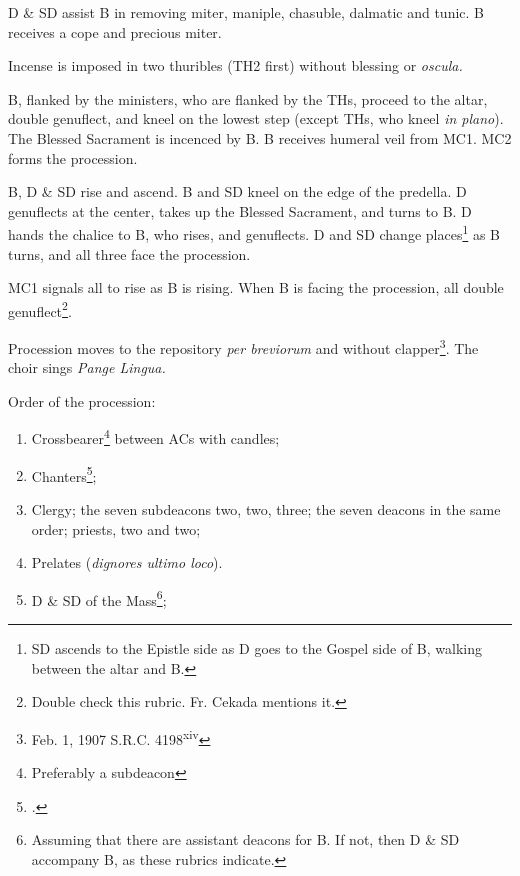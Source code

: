 {\rubric D \& SD assist B in removing miter, maniple, chasuble, dalmatic and
tunic. B receives a cope and precious miter.

\rubric Incense is imposed in two thuribles (TH2 first) without blessing or
\textit{oscula.}

\rubric B, flanked by the ministers, who are flanked by the THs, proceed to the
altar, double genuflect, and kneel on the lowest step (except THs, who kneel
\textit{in plano}). The Blessed Sacrament is incenced by B. B receives humeral
veil from MC1. MC2 forms the procession.

\rubric B, D \& SD rise and ascend. B and SD kneel on the edge of the predella.
D genuflects at the center, takes up the Blessed Sacrament, and turns to B. D
hands the chalice to B, who rises, and genuflects. D and SD change
places\footnote{SD ascends to the Epistle side as D goes to the Gospel side of
B, walking between the altar and B.} as B turns, and all three face the
procession.

\rubric MC1 signals all to rise as B is rising. When B is facing the
procession, all double genuflect\footnote{Double check this rubric. Fr. Cekada
mentions it.}.

\rubric Procession moves to the repository \textit{per breviorum} and without
clapper\footnote{Feb. 1, 1907 S.R.C. 4198\textsuperscript{xiv}}. The choir
sings \textit{Pange Lingua.}

\rubric Order of the procession:

\begin{enumerate}
    
    \item Crossbearer\footnote{Preferably a subdeacon} between ACs with
        candles;

    \item Chanters\footcite[``If they are clerics; if not they precede the
        cross-bearer''.][p. 191]{stehle};

    \item Clergy; the seven subdeacons two, two, three; the seven deacons in
        the same order; priests, two and two;

    \item Prelates (\textit{dignores ultimo loco}).

    \item D \& SD of the Mass\footnote{Assuming that there are assistant
        deacons for B. If not, then D \& SD accompany B, as these rubrics
        indicate.};


\end{enumerate}}
